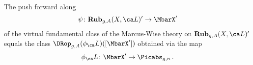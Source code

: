 





\begin{lemma}
\notready\label{lem:DRop_eq_MW}
The push forward along
$$\psi\colon \cat{Rub}_{g,A}(X, \ca L)' \to \MbarX'$$
of the virtual fundamental class of the Marcus-Wise theory
on $\cat{Rub}_{g,A}(X, \ca L)'$
equals the class $\DRop_{g,A}(\phi_\ca L)([\MbarX'])$
obtained via the map
$$\phi_\ca L\colon \MbarX' \to \Picabs_{g,n}\, .$$
\end{lemma}
